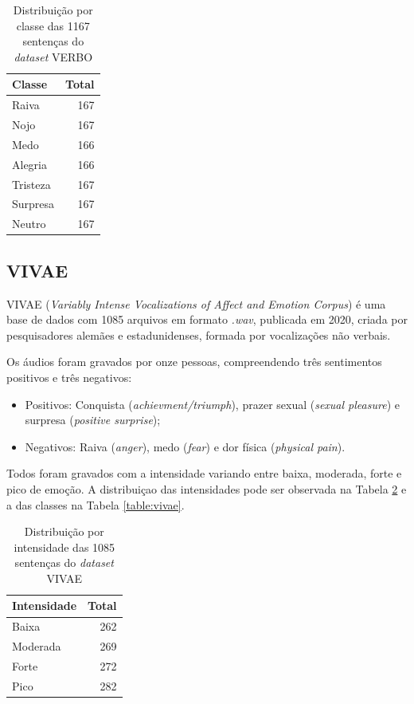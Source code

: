 \begin{table}[!ht]\label{table:verbo}
\centering
\caption{Distribuição por classe das 1167 sentenças do \textit{dataset} VERBO}
    \begin{tabular}{|l|r|}
    \hline
        Classe & Total \\ \hline
        Raiva & 167  \\ \hline
        Nojo & 167  \\ \hline
        Medo & 166  \\ \hline
        Alegria & 166  \\ \hline
        Tristeza & 167  \\ \hline
        Surpresa & 167  \\ \hline
        Neutro & 167  \\ \hline
    \end{tabular}
\end{table}

\subsection{VIVAE}

VIVAE \cite{16} (\textit{Variably Intense Vocalizations of Affect and Emotion Corpus}) é uma base de dados com 1085 arquivos em formato \textit{.wav}, publicada em 2020, criada por pesquisadores alemães e estadunidenses, formada por vocalizações não verbais.

Os áudios foram gravados por onze pessoas, compreendendo três sentimentos positivos e três negativos:

\begin{itemize}
    \item Positivos: Conquista (\textit{achievment/triumph}), prazer sexual (\textit{sexual pleasure}) e surpresa (\textit{positive surprise});
    \item Negativos: Raiva (\textit{anger}), medo (\textit{fear}) e dor física (\textit{physical pain}).
\end{itemize}

Todos foram gravados com a intensidade variando entre baixa, moderada, forte e pico de emoção. A distribuiçao das intensidades pode ser observada na Tabela \ref{table:vivaeintensidade} e a das classes na Tabela \ref{table:vivae}.

\begin{table}[!ht]\label{table:vivaeintensidade}
    \centering
    \caption{Distribuição por intensidade das 1085 sentenças do \textit{dataset} VIVAE}
    \begin{tabular}{|l|r|}
    \hline
        Intensidade & Total  \\ \hline
        Baixa & 262  \\ \hline
        Moderada & 269  \\ \hline
        Forte & 272  \\ \hline
        Pico & 282  \\ \hline
    \end{tabular}
\end{table}

